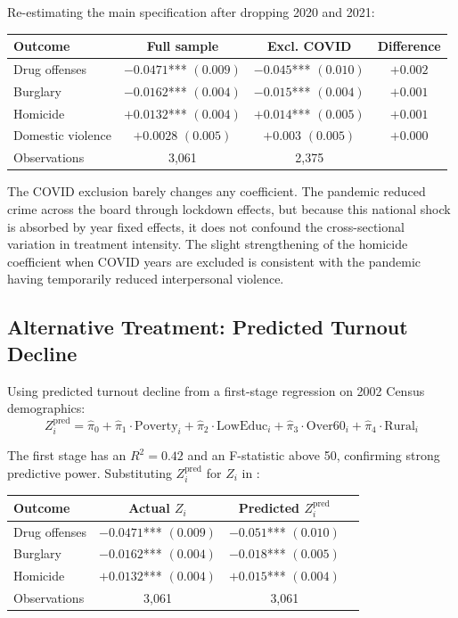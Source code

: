 \documentclass[12pt]{article}
\begin{document}
Re-estimating the main specification after dropping 2020 and 2021:

\begin{center}
\begin{tabular}{lccc}
\toprule
Outcome & Full sample & Excl. COVID & Difference \\
\midrule
Drug offenses   & $-0.0471$*** $(0.009)$ & $-0.045$*** $(0.010)$ & $+0.002$ \\
Burglary        & $-0.0162$*** $(0.004)$ & $-0.015$*** $(0.004)$ & $+0.001$ \\
Homicide        & $+0.0132$*** $(0.004)$ & $+0.014$*** $(0.005)$ & $+0.001$ \\
Domestic violence & $+0.0028$ $(0.005)$  & $+0.003$ $(0.005)$   & $+0.000$ \\
\midrule
Observations & 3,061 & 2,375 & \\
\bottomrule
\end{tabular}
\end{center}

The COVID exclusion barely changes any coefficient. The pandemic reduced crime across the board through lockdown effects, but because this national shock is absorbed by year fixed effects, it does not confound the cross-sectional variation in treatment intensity. The slight strengthening of the homicide coefficient when COVID years are excluded is consistent with the pandemic having temporarily reduced interpersonal violence.

\subsection{Alternative Treatment: Predicted Turnout Decline}

Using predicted turnout decline from a first-stage regression on 2002 Census demographics:
\begin{equation}
Z_i^{\text{pred}} = \hat{\pi}_0 + \hat{\pi}_1 \cdot \text{Poverty}_i + \hat{\pi}_2 \cdot \text{LowEduc}_i + \hat{\pi}_3 \cdot \text{Over60}_i + \hat{\pi}_4 \cdot \text{Rural}_i
\end{equation}

The first stage has an $R^2 = 0.42$ and an F-statistic above 50, confirming strong predictive power. Substituting $Z_i^{\text{pred}}$ for $Z_i$ in :

\begin{center}
\begin{tabular}{lccc}
\toprule
Outcome & Actual $Z_i$ & Predicted $Z_i^{\text{pred}}$ \\
\midrule
Drug offenses   & $-0.0471$*** $(0.009)$ & $-0.051$*** $(0.010)$ \\
Burglary        & $-0.0162$*** $(0.004)$ & $-0.018$*** $(0.005)$ \\
Homicide        & $+0.0132$*** $(0.004)$ & $+0.015$*** $(0.004)$ \\
\midrule
Observations & 3,061 & 3,061 \\
\bottomrule
\end{tabular}
\end{center}
\end{document}
